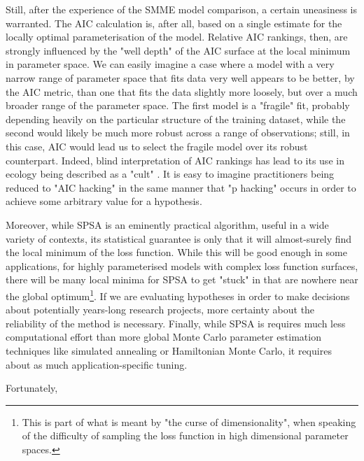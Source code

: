 Still, after the experience of the SMME model comparison, a certain uneasiness is warranted. The AIC calculation is, after all, based on a single estimate for the locally optimal parameterisation of the model. Relative AIC rankings, then, are strongly influenced by the "well depth" of the AIC surface at the local minimum in parameter space. We can easily imagine a case where a model with a very narrow range of parameter space that fits data very well appears to be better, by the AIC metric, than one that fits the data slightly more loosely, but over a much broader range of the parameter space. The first model is a "fragile" fit, probably depending heavily on the particular structure of the training dataset, while the second would likely be much more robust across a range of observations; still, in this case, AIC would lead us to select the fragile model over its robust counterpart. Indeed, blind interpretation of AIC rankings has lead to its use in ecology being described as a "cult" \cite{Brewer2020}. It is easy to imagine practitioners being reduced to "AIC hacking" in the same manner that "p hacking" occurs in order to achieve some arbitrary value for a hypothesis.

Moreover, while SPSA is an eminently practical algorithm, useful in a wide variety of contexts, its statistical guarantee is only that it will almost-surely find the local minimum of the loss function. While this will be good enough in some applications, for highly parameterised models with complex loss function surfaces, there will be many local minima for SPSA to get "stuck" in that are nowhere near the global optimum\footnote{This is part of what is meant by "the curse of dimensionality", when speaking of the difficulty of sampling the loss function in high dimensional parameter spaces.}. If we are evaluating hypotheses in order to make decisions about potentially years-long research projects, more certainty about the reliability of the method is necessary. Finally, while SPSA is requires much less computational effort than more global Monte Carlo parameter estimation techniques like simulated annealing or Hamiltonian Monte Carlo, it requires about as much application-specific tuning.

Fortunately, 


